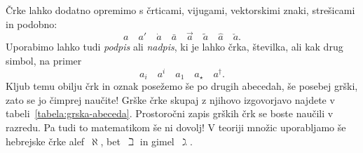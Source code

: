 Črke lahko dodatno opremimo s črticami, vijugami, vektorskimi znaki, strešicami in podobno:
%
\begin{equation*}
 a \quad
 a' \quad
 \dot{a} \quad
 \bar{a} \quad
 \vec{a} \quad
 \tilde{a} \quad
 \hat{a} \quad
 \check{a}.
\end{equation*}
%
 Uporabimo lahko tudi \emph{podpis} ali
\emph{nadpis}, ki je lahko črka, številka, ali kak drug simbol, na primer
%
\begin{equation*}
  a_i \quad
  a^i \quad
  a_1 \quad
  a_{\star} \quad
  a^{\dagger}.
\end{equation*}
%
Kljub temu obilju črk in oznak posežemo še po drugih abecedah, še posebej grški, zato
se jo čimprej naučite! Grške črke skupaj z njihovo izgovorjavo najdete v
tabeli~\ref{tabela:grska-abeceda}. Prostoročni zapis grških črk se boste naučili v
razredu.
%
Pa tudi to matematikom še ni dovolj! V teoriji množic uporabljamo še hebrejske črke
alef~$\aleph$, bet~$\beth$ in gimel~$\gimel$.

